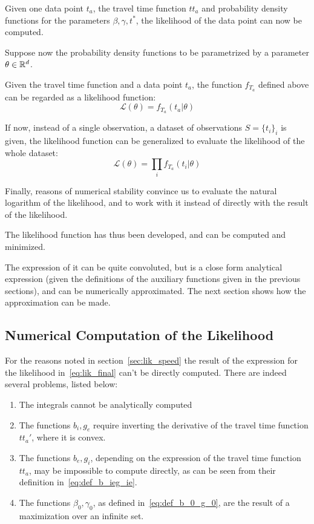 Given one data point \(t_a\), the travel time function \(tt_a\) and probability density functions for the parameters \(\beta, \gamma, t^*\),
the likelihood of the data point can now be computed.

Suppose now the probability density functions to be parametrized by a parameter \(\theta\in\mathbb{R}^d\).

Given the travel time function and a data point \(t_a\),
the function \(f_{T_a}\) defined above can be regarded as a likelihood function:
\begin{equation*}
  \mathcal{L}(\theta) = f_{T_a}(t_a | \theta)
\end{equation*}

If now, instead of a single observation, a dataset of observations \(S = \{t_i\}_i\) is given,
the likelihood function can be generalized to evaluate the likelihood of the whole dataset:
\begin{equation*}
  \mathcal{L}(\theta) = \prod_i f_{T_a}(t_i | \theta)
\end{equation*}

Finally, reasons of numerical stability convince us to evaluate the natural logarithm of the likelihood,
and to work with it instead of directly with the result of the likelihood.

The likelihood function has thus been developed, and can be computed and minimized.

The expression of it can be quite convoluted, but is a close form analytical expression
(given the definitions of the auxiliary functions given in the previous sections),
and can be numerically approximated.
The next section shows how the approximation can be made.

\subsection{Numerical Computation of the Likelihood}
\label{sec:numerical_lik}

For the reasons noted in section~\ref{sec:lik_speed}
the result of the expression for the likelihood in~\eqref{eq:lik_final} can't be directly computed.
There are indeed several problems, listed below:
\begin{enumerate}
\item The integrals cannot be analytically computed
\item The functions \(b_i, g_e\) require inverting the derivative of the travel time function \(tt_a'\),
  where it is convex.
\item The functions \(b_e, g_i\), depending on the expression of the travel time function \(tt_a\),
  may be impossible to compute directly, as can be seen from their definition in~\eqref{eq:def_b_ieg_ie}.
\item The functions \(\beta_0, \gamma_0\), as defined in~\eqref{eq:def_b_0_g_0},
  are the result of a maximization over an infinite set.
\end{enumerate}

